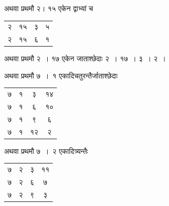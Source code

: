 \documentclass[11pt, openany]{book}
\begin{document}
\begin{minipage}[]{0.6\textwidth}
अथवा प्रथमौ २। १५ एकेन द्वाभ्यां च
\end{minipage}
\begin{minipage}[]{0.5\textwidth}
	\vspace{0.2cm}
	\begin{tabular}{|c|c|c|c|}
		\hline
		२ & १५ & ३ & ५\\
		२ & १५ & ६ & १\\
		\hline
	\end{tabular}
\end{minipage}
\vspace{2mm}

अथवा प्रथमौ २~। १७ एकेन जाताश्छेदाः २~। १७~। ३~। २~।
\vspace{2mm}

\begin{minipage}[]{0.6\textwidth}
अथवा प्रथमौ ७~।~१ एकादिचतुरन्तैर्जाताश्छेदाः\textemdash 
\end{minipage}
\begin{minipage}[]{0.5\textwidth}
	\vspace{0.2cm}
\begin{tabular}{|c|c|c|c|}
	\hline
		७ & १& ३ & १४\\
		७ & १ & ६ & १०\\
		७ & १ & ९ & ६\\
		७ & १ & १२ & २\\
		\hline
	\end{tabular}
\end{minipage}
\vspace{2mm}

\begin{minipage}[]{0.6\textwidth}
अथवा प्रथमौ ७~।~२ एकादित्र्यन्तैः\textemdash 
\end{minipage}
\begin{minipage}[]{0.5\textwidth}
	\begin{tabular}{|c|c|c|c|}
	\hline
		७ & २& ३ & ११\\
		७ & २& ६ & ७\\
		७ & २& ९ & ३\\
	\hline
	\end{tabular}
\end{minipage}
\vspace{0.2cm}
\end{document}
